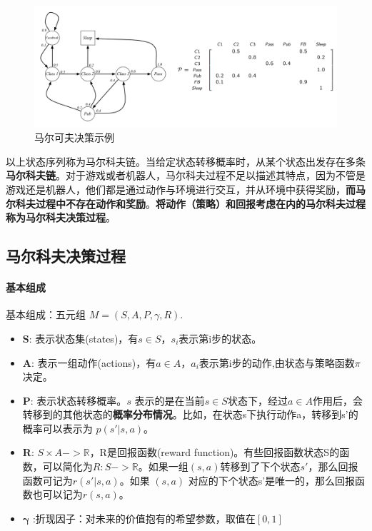 \documentclass[UTF8,a4paper,12pt]{ctexbook}
\begin{document}
				\begin{figure}[H]
					\centering
					\includegraphics[width=.6\linewidth]{MDP-example}
					\caption{马尔可夫决策示例}
				\end{figure}
				
				以上状态序列称为马尔科夫链。当给定状态转移概率时，从某个状态出发存在多条\textbf{马尔科夫链}。对于游戏或者机器人，马尔科夫过程不足以描述其特点，因为不管是游戏还是机器人，他们都是通过动作与环境进行交互，并从环境中获得奖励，\textbf{而马尔科夫过程中不存在动作和奖励}。\textbf{将动作（策略）和回报考虑在内的马尔科夫过程称为马尔科夫决策过程}。
				
		\subsection{马尔科夫决策过程}
		
			\paragraph{基本组成}
			基本组成：五元组 $M=(S,A,P,\gamma,R)$.
								
			\begin{itemize}[itemindent = 1em]
				\item \textbf{S}: 表示状态集(states)，有$s \in S$，$s_i$表示第i步的状态。
				
				\item \textbf{A}: 表示一组动作(actions)，有$a \in A$，$a_i$表示第i步的动作,由状态与策略函数$\pi$ 决定。
				
				\item \textbf{P}: 表示状态转移概率。$s$ 表示的是在当前$s \in S$状态下，经过$a \in A$作用后，会转移到的其他状态的\textbf{概率分布情况}。比如，在状态s下执行动作a，转移到s'的概率可以表示为 $p(s'|s,a)$。
				
				\item \textbf{R}: $S \times A->\mathbb{R}$，R是回报函数(reward function)。有些回报函数状态S的函数，可以简化为$R:S->\mathbb{R}$。如果一组$(s,a)$转移到了下个状态$s'$，那么回报函数可记为$r(s'|s, a)$。如果 $(s,a)$ 对应的下个状态s'是唯一的，那么回报函数也可以记为$r(s,a)$。
				
				\item $\mathbf{\gamma}$ :折现因子：对未来的价值抱有的希望参数，取值在$[0,1]$
			\end{itemize}
			
\end{document}
